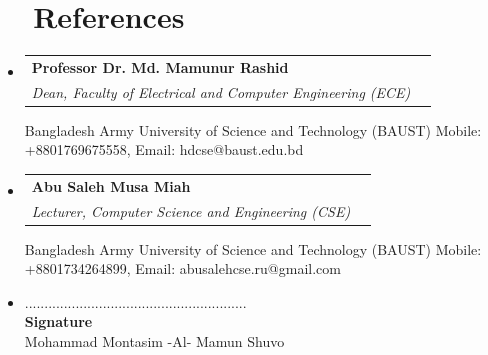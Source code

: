\documentclass[a4paper]{article}
\makeatletter
\newcommand{\resumeSubheading}[4]{
  \vspace{-1pt}\item
    \begin{tabular*}{0.97\textwidth}{l@{\extracolsep{\fill}}r}
      \textbf{#1} & #2 \\
      \textit{#3} & \textit{#4} \\
    \end{tabular*}\vspace{-5pt}
}
\newcommand{\resumeSubHeadingListStart}{\begin{itemize}[leftmargin=*]}
\newcommand{\resumeSubHeadingListEnd}{\end{itemize}}
\makeatother
\begin{document}
\section{~~References}
    \resumeSubHeadingListStart
        \resumeSubheading
          {Professor Dr. Md. Mamunur Rashid}{} 
          {Dean, Faculty of Electrical and Computer Engineering (ECE)}{} 
          \hfill \break
          {Bangladesh Army University of Science and Technology (BAUST)
          \newline
          Mobile: +8801769675558, Email: hdcse@baust.edu.bd}
        
        \resumeSubheading
      {Abu Saleh Musa Miah}{} 
      {Lecturer, Computer Science and Engineering (CSE)}{} 
      \hfill \break
      {Bangladesh Army University of Science and Technology (BAUST)
      \newline
      Mobile: +8801734264899, Email: abusalehcse.ru@gmail.com}
  \resumeSubHeadingListEnd
  \vspace{1pt}




  \resumeSubHeadingListStart
  \item[]
     \vspace{50pt}
     {\hspace{120mm} .........................................................}
     \\
     {\hspace{141mm} \textbf{Signature}}
     \\
     {\hspace{115mm} Mohammad Montasim -Al- Mamun Shuvo}
  \resumeSubHeadingListEnd
  \vspace{1pt}
\end{document}
